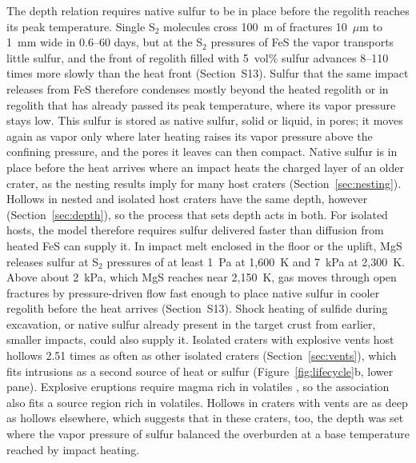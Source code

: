 \documentclass[article,review]{planetary}
\begin{document}
The depth relation requires native sulfur to be in place before the regolith reaches its peak temperature. Single S$_2$ molecules cross 100~m of fractures 10~$\mu$m to 1~mm wide in 0.6--60 days, but at the S$_2$ pressures of FeS the vapor transports little sulfur, and the front of regolith filled with 5~vol\% sulfur advances 8--110 times more slowly than the heat front (Section~S13). Sulfur that the same impact releases from FeS therefore condenses mostly beyond the heated regolith or in regolith that has already passed its peak temperature, where its vapor pressure stays low. This sulfur is stored as native sulfur, solid or liquid, in pores; it moves again as vapor only where later heating raises its vapor pressure above the confining pressure, and the pores it leaves can then compact. Native sulfur is in place before the heat arrives where an impact heats the charged layer of an older crater, as the nesting results imply for many host craters (Section~\ref{sec:nesting}). Hollows in nested and isolated host craters have the same depth, however (Section~\ref{sec:depth}), so the process that sets depth acts in both. For isolated hosts, the model therefore requires sulfur delivered faster than diffusion from heated FeS can supply it. In impact melt enclosed in the floor or the uplift, MgS releases sulfur at S$_2$ pressures of at least 1~Pa at 1,600~K and 7~kPa at 2,300~K. Above about 2~kPa, which MgS reaches near 2,150~K, gas moves through open fractures by pressure-driven flow fast enough to place native sulfur in cooler regolith before the heat arrives (Section~S13). Shock heating of sulfide during excavation, or native sulfur already present in the target crust from earlier, smaller impacts, could also supply it. Isolated craters with explosive vents host hollows 2.51 times as often as other isolated craters (Section~\ref{sec:vents}), which fits intrusions as a second source of heat or sulfur (Figure~\ref{fig:lifecycle}b, lower pane). Explosive eruptions require magma rich in volatiles \parencite{kerber2011}, so the association also fits a source region rich in volatiles. Hollows in craters with vents are as deep as hollows elsewhere, which suggests that in these craters, too, the depth was set where the vapor pressure of sulfur balanced the overburden at a base temperature reached by impact heating.
\end{document}
